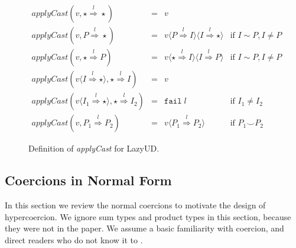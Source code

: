 \documentclass[acmsmall,review,anonymous]{acmart}\settopmatter{printfolios=true,printccs=false,printacmref=false}
\newcommand{\stxrule}[3]{#1 & ::= & #3 & \text{#2}\\}
\newcommand{\lazyUD}{Lazy\;UD}
\newcommand{\cOOcast}[3]{#1 \overset{#2}{\Rightarrow} #3}
\newcommand{\vOOcast}[2]{#1\langle#2\rangle}
\newcommand{\rOOfail}[1]{\mathtt{fail}\;#1}
\begin{document}
\begin{figure}
%
%  
  \[
  \begin{array}{rclr}
    \mathit{applyCast}(v, \cOOcast{\star}{l}{\star} ) &=& v \\
    \mathit{applyCast}(v, \cOOcast{P}{l}{\star}) &=&
        v \langle \cOOcast{P}{l}{I} \rangle
          \langle \cOOcast{I}{l}{\star} \rangle
        & \text{if } I \sim P, I \neq P \\  
    \mathit{applyCast}(v, \cOOcast{\star}{l}{P}) &=&          
        v \langle \cOOcast{\star}{l}{I} \rangle
          \langle \cOOcast{I}{l}{P} \rangle
        & \text{if } I \sim P, I \neq P \\  
  \mathit{applyCast}(v \langle \cOOcast{I}{l}{\star} \rangle , \cOOcast{\star}{l}{I}) &=& v \\
  \mathit{applyCast}(v \langle \cOOcast{I_1}{l}{\star} \rangle , \cOOcast{\star}{l}{I_2}) &=& \rOOfail{l} & \text{if } I_1 \neq I_2 \\
  \mathit{applyCast}(v, \cOOcast{P_1}{l}{P_2}) &=&
     v \langle \cOOcast{P_1}{l}{P_2} \rangle & \text{if } P_1 \smile P_2
  \end{array}
  \]


  \caption{Definition of \textit{applyCast} for \lazyUD{}.}
  \label{fig:apply-Cast-UD}
\end{figure}


\clearpage
\pagebreak

\subsection{Coercions in Normal Form} 
\label{sec:coercion-calculus}

In this section we review the normal coercions \citep{siek2012interpretations} 
to motivate the design of hypercoercion. 
We ignore sum types and product types in this 
section, because they were not in the paper. We assume a basic 
familiarity with coercion, and direct readers who do not know it to 
\citet{siek2012interpretations}.
\end{document}

